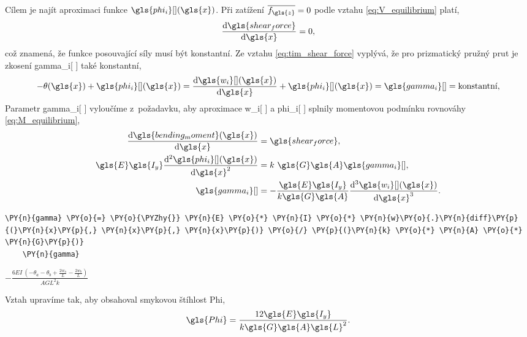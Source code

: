 \vspace{0.3cm} 
Cílem je najít aproximaci funkce $\gls{phi_i}[ ](\gls{x})$. Při zatížení $\overline{f_{\gls{z}}} = 0$ podle vztahu \ref{eq:V_equilibrium} platí,
\begin{equation*}
    \dv{\gls{shear_force}}{\gls{x}} = 0,
\end{equation*}
což znamená, že funkce posouvající síly musí být konstantní.
Ze vztahu \ref{eq:tim_shear_force} vyplývá, že pro prizmatický pružný prut je zkosení \gls{gamma_i}[ ] také konstantní,
\begin{equation}
    \label{eq:tim_dwdx_phi}
    -\theta(\gls{x}) + \gls{phi_i}[ ](\gls{x}) = \dv{\gls{w_i}[ ](\gls{x})}{\gls{x}} + \gls{phi_i}[ ](\gls{x}) = \gls{gamma_i}[ ]=\text{konstantní},
\end{equation}
Parametr \gls{gamma_i}[ ] vyloučíme z~požadavku, aby aproximace \gls{w_i}[ ] a \gls{phi_i}[ ] splnily momentovou podmínku rovnováhy \ref{eq:M_equilibrium},
\begin{equation}
    \begin{split}
    \dv{\gls{bending_moment}(\gls{x})}{\gls{x}}  &= \gls{shear_force},\\
    \gls{E}\gls{I_y}\dv[2]{\gls{phi_i}[ ](\gls{x})}{\gls{x}} &= k~\gls{G} \gls{A} \gls{gamma_i}[ ],\\
    \gls{gamma_i}[ ] &= - \frac{\gls{E}\gls{I_y}}{k \gls{G} \gls{A}} \dv[3]{\gls{w_i}[ ](\gls{x})}{\gls{x}}.
    \end{split}
\end{equation}
\begin{tcolorbox}[breakable, size=fbox, boxrule=1pt, pad at break*=1mm,colback=cellbackground, colframe=cellborder]
    \begin{Verbatim}[commandchars=\\\{\}]
    \PY{n}{gamma} \PY{o}{=} \PY{o}{\PYZhy{}} \PY{n}{E} \PY{o}{*} \PY{n}{I} \PY{o}{*} \PY{n}{w}\PY{o}{.}\PY{n}{diff}\PY{p}{(}\PY{n}{x}\PY{p}{,} \PY{n}{x}\PY{p}{,} \PY{n}{x}\PY{p}{)} \PY{o}{/} \PY{p}{(}\PY{n}{k} \PY{o}{*} \PY{n}{A} \PY{o}{*} \PY{n}{G}\PY{p}{)}
    \PY{n}{gamma}
    \end{Verbatim}
    \end{tcolorbox}
            
        
    $\displaystyle - \frac{6 E I~\left(- \theta_{a} - \theta_{b} + \frac{2 w_{a}}{L} - \frac{2 w_{b}}{L}\right)}{A G L^{2} k}$

\vspace{0.3cm}
Vztah upravíme tak, aby obsahoval smykovou štíhlost \gls{Phi},
\begin{equation} \label{eq:tim_omega}
    \gls{Phi} = \frac{12\gls{E}\gls{I_y}}{k\gls{G}\gls{A}\gls{L}^2}.
\end{equation}
    
